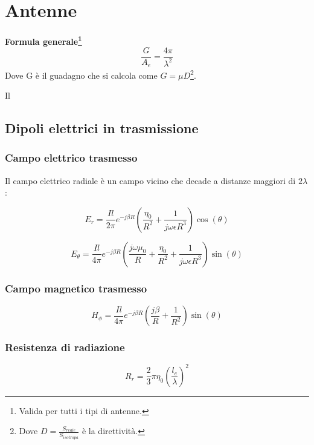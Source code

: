 \chapter{Antenne}
		\textbf{Formula generale\footnote{Valida per tutti i tipi di antenne.}}
		\begin{equation}
		\frac{G}{A_e}=\frac{4\pi}{\lambda^2}
		\end{equation}
	    Dove G è il guadagno che si calcola come $G=\mu D$\footnote{Dove $D=\frac{S_{reale}}{S_{isotropa}}$ è la direttività.}.

	    Il
	 \section{Dipoli elettrici in trasmissione}

		\subsection{Campo elettrico trasmesso}

		Il campo elettrico radiale è un campo vicino che decade a distanze maggiori di $2\lambda$:
		
		\begin{equation}
		E_r=\frac{I{l}}{2\pi}e^{-j\beta R}(\frac{ \eta_0}{R^2}+\frac{1}{j \omega \epsilon R^3})\cos(\theta)
		\end{equation}
		
		\begin{equation}
		 E_{\theta} = \frac {Il} {4\pi} e^{-j\beta R} ( \frac {j\omega \mu_0} {R} + \frac {\eta_0} {R^2} + \frac {1}  {j \omega \epsilon R^3} ) \sin(\theta)
		\end{equation}

		\subsection{Campo magnetico trasmesso}

		\begin{equation}
		H_{\phi}=\frac{Il}{4\pi}e^{-j\beta R}(\frac{j \beta}{R}+\frac{1}{R^2})\sin(\theta)
		\end{equation}
		\subsection{Resistenza di radiazione}			
				\begin{equation}
				R_r=\frac{2}{3}\pi\eta_0(\frac{l_e}{\lambda})^2
				\end{equation}



